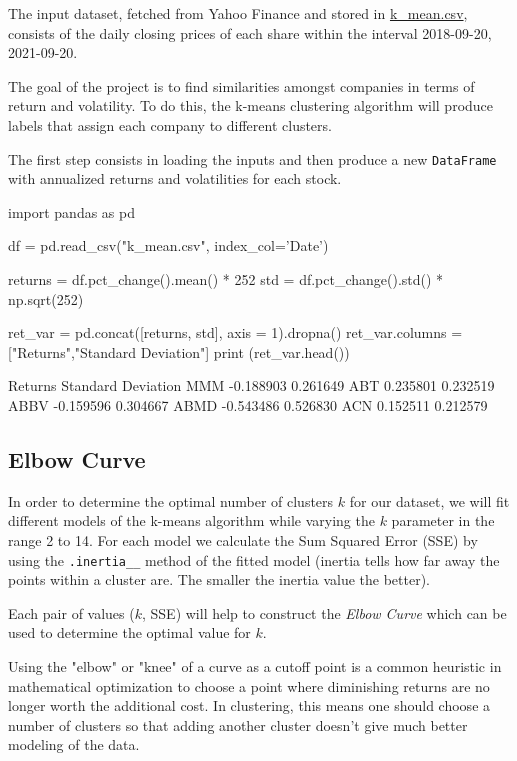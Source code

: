 The input dataset, fetched from Yahoo Finance and stored in \href{https://github.com/matteosan1/finance_course/raw/develop/libro/input_files/k\_mean.csv}{k\_mean.csv}, consists of the daily closing prices of each share within the interval 2018-09-20, 2021-09-20.
    
The goal of the project is to find similarities amongst companies in terms of return and volatility. To do this, the k-means clustering algorithm will produce labels that assign each company to different clusters.
 
The first step consists in loading the inputs and then produce a new \texttt{DataFrame} with annualized returns and volatilities for each stock. 
 
\begin{ipython}
import pandas as pd
 
df = pd.read_csv("k_mean.csv", index_col='Date')
 
returns = df.pct_change().mean() * 252
std = df.pct_change().std() * np.sqrt(252)
 
ret_var = pd.concat([returns, std], axis = 1).dropna()
ret_var.columns = ["Returns","Standard Deviation"]
print (ret_var.head())
\end{ipython}
\begin{ioutput}
       Returns  Standard Deviation
MMM  -0.188903            0.261649
ABT   0.235801            0.232519
ABBV -0.159596            0.304667
ABMD -0.543486            0.526830
ACN   0.152511            0.212579
\end{ioutput}

\subsection{Elbow Curve}
 
In order to determine the optimal number of clusters $k$ for our dataset, we will fit different models of the k-means algorithm while varying the $k$ parameter in the range 2 to 14. For each model we calculate the Sum Squared Error (SSE) by using the \texttt{.inertia\_\_} method of the fitted model (inertia tells how far away the points within a cluster are. The smaller the inertia value the better).
 
Each pair of values ($k$, SSE) will help to construct the \emph{Elbow Curve} which can be used to determine the optimal value for $k$. 
 
Using the "elbow" or "knee" of a curve as a cutoff point is a common heuristic in mathematical optimization to choose a point where diminishing returns are no longer worth the additional cost. In clustering, this means one should choose a number of clusters so that adding another cluster doesn't give much better modeling of the data.
 
